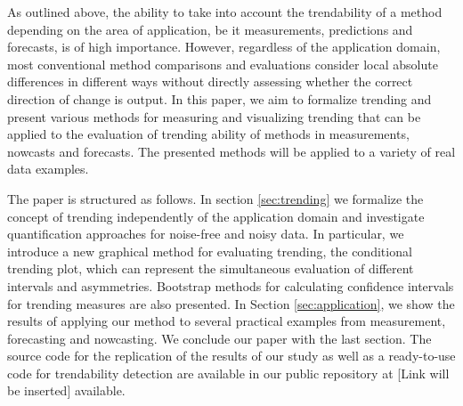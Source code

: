 As outlined above, the ability to take into account the trendability of a method depending on the area of application, be it measurements, predictions and forecasts, is of high importance. 
However, regardless of the application domain, most conventional method comparisons and evaluations consider local absolute differences in different ways without directly assessing whether the correct direction of change is output. 
In this paper, we aim to formalize trending and present various methods for measuring and visualizing trending that can be applied to the evaluation of trending ability of methods in measurements, nowcasts and forecasts. 
The presented methods will be applied to a variety of real data examples. 

The paper is structured as follows. 
In section \ref{sec:trending} we formalize the concept of trending independently of the application domain and investigate quantification approaches for noise-free and noisy data. 
In particular, we introduce a new graphical method for evaluating trending, the conditional trending plot, which can represent the simultaneous evaluation of different intervals and asymmetries. 
Bootstrap methods for calculating confidence intervals for trending measures are also presented. 
In Section \ref{sec:application}, we show the results of applying our method to several practical examples from measurement, forecasting and nowcasting. 
We conclude our paper with the last section.
The source code for the replication of the results of our study as well as a ready-to-use code for trendability detection are available in our public repository at [Link will be inserted] available.